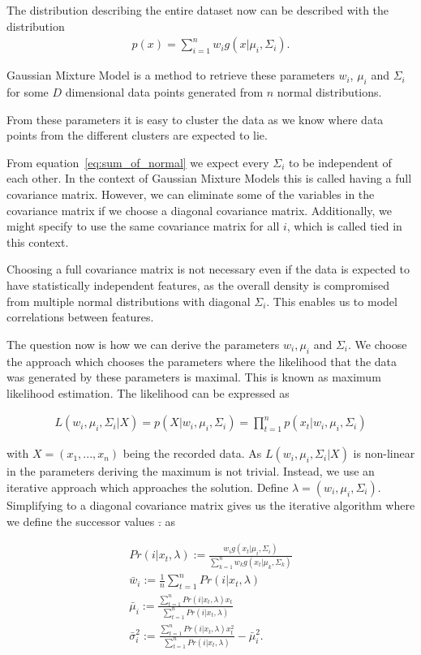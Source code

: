 The distribution describing the entire dataset now can be described with the distribution
\begin{align}
	\label{eq:sum_of_normal}
	p(x) = \sum_{i=1}^{n} w_i g(x|\mu_i, \Sigma_i).
\end{align}

Gaussian Mixture Model is a method to retrieve these parameters $w_i$, $\mu_i$ and $\Sigma_i$ for some $D$ dimensional data points generated from $n$ normal distributions.

From these parameters it is easy to cluster the data as we know where data points from the different clusters are expected to lie.

From equation~\ref{eq:sum_of_normal} we expect every $\Sigma_i$ to be independent of each other. In the context of Gaussian Mixture Models this is called having a full covariance matrix. However, we can eliminate some of the variables in the covariance matrix if we choose a diagonal covariance matrix. Additionally, we might specify to use the same covariance matrix for all $i$, which is called tied in this context.

Choosing a full covariance matrix is not necessary even if the data is expected to have statistically independent features, as the overall density is compromised from multiple normal distributions with diagonal $\Sigma_i$. This enables us to model correlations between features.

The question now is how we can derive the parameters $w_i, \mu_i$ and $\Sigma_i$. We choose the approach which chooses the parameters where the likelihood that the data was generated by these parameters is maximal. This is known as maximum likelihood estimation. The likelihood can be expressed as

\begin{align*}
	L(w_i, \mu_i, \Sigma_i|X) = p(X|w_i, \mu_i, \Sigma_i) = \prod_{t=1}^n p(x_t|w_i, \mu_i, \Sigma_i)
\end{align*}

with $X = (x_1, ..., x_n)$ being the recorded data. As $L(w_i, \mu_i, \Sigma_i|X)$ is non-linear in the parameters deriving the maximum is not trivial. Instead, we use an iterative approach which approaches the solution. Define $\lambda = (w_i, \mu_i, \Sigma_i)$. Simplifying to a diagonal covariance matrix gives us the iterative algorithm where we define the successor values $\bar{.}$ as

\begin{align*}
	Pr(i | x_t, \lambda) := \frac{w_i g(x_t | \mu_i, \Sigma_i)}{\sum_{k=1}^{n} w_k g(x_t | \mu_k, \Sigma_k)}\\
	\bar{w}_i := \frac{1}{n} \sum_{t=1}^{n} Pr(i | x_t, \lambda)\\
	\bar{\mu}_i := \frac{\sum_{t=1}^{n} Pr(i | x_t, \lambda) x_t}{\sum_{t=1}^{n} Pr(i | x_t, \lambda)}\\
	\bar{\sigma}_i^2 := \frac{\sum_{t=1}^{n} Pr(i | x_t, \lambda) x_t^2}{\sum_{t=1}^{n} Pr(i | x_t, \lambda)} - \bar{\mu}_i^2.
\end{align*}

